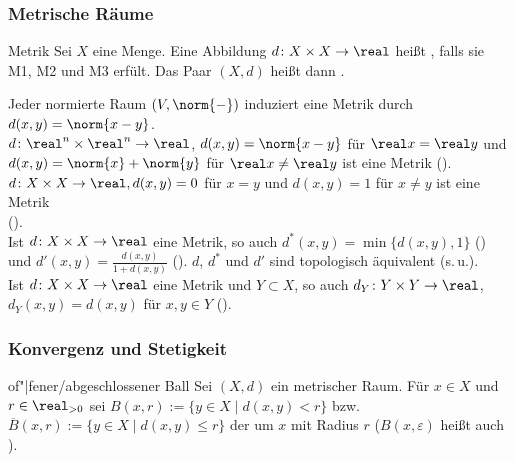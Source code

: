 \subsubsection{%
    Metrische Räume%
}

\begin{Def}{Metrik}
    Sei $X$ eine Menge.
    Eine Abbildung $d\colon X \times X \rightarrow \real$ heißt
    , falls sie M1, M2 und M3 erfült.
    Das Paar $(X, d)$ heißt dann .
\end{Def}

\begin{Bsp}
    Jeder normierte Raum $(V, \norm{-})$ induziert eine Metrik durch
    $d(x, y) = \norm{x - y}$. \\
    $d\colon \real^n \times \real^n \rightarrow \real$,
    $d(x, y) = \norm{x - y}$ für $\real x = \real y$ und
    $d(x, y) = \norm{x} + \norm{y}$ für $\real x \not= \real y$
    ist eine Metrik (). \\
    $d\colon X \times X \rightarrow \real, d(x, y) = 0$ für $x = y$ und
    $d(x, y) = 1$ für $x \not= y$ ist eine Metrik \\
    (). \\
    Ist $d\colon X \times X \rightarrow \real$ eine Metrik, so auch
    $d^\ast(x, y) = \min\{d(x, y), 1\}$ () und
    $d'(x, y) = \frac{d(x, y)}{1 + d(x, y)}$ ().
    $d$, $d^\ast$ und $d'$ sind topologisch äquivalent (s.\,u.). \\
    Ist $d\colon X \times X \rightarrow \real$ eine Metrik und
    $Y \subset X$, so auch $d_Y\colon Y \times Y \rightarrow \real$,
    $d_Y(x, y)= d(x, y)$ für $x, y \in Y$ ().
\end{Bsp}

\subsubsection{%
    Konvergenz und Stetigkeit%
}

\begin{Def}{of"|fener/abgeschlossener Ball}
    Sei $(X, d)$ ein metrischer Raum.
    Für $x \in X$ und $r \in \real_{> 0}$ sei
    $B(x, r) := \{y \in X \;|\; d(x, y) < r\}$ bzw.
    $\overline{B}(x, r) := \{y \in X \;|\; d(x, y) \le r\}$
    der  um $x$ mit Radius $r$
    ($B(x, \varepsilon)$ heißt auch ).
\end{Def}

